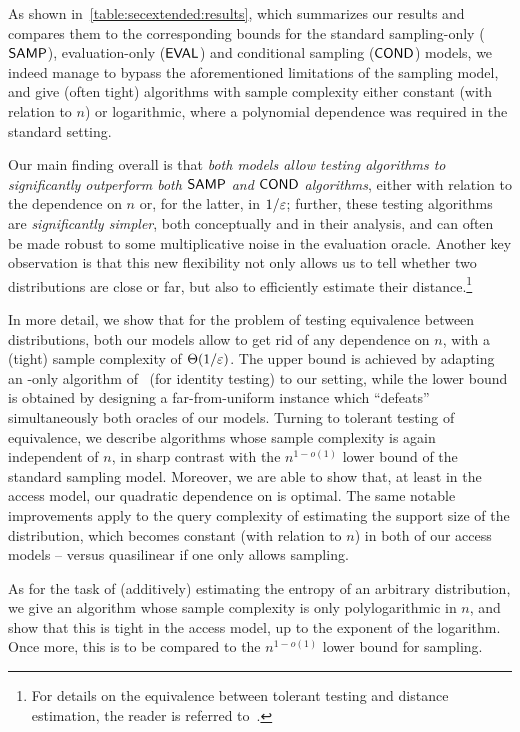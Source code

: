   As shown in~\cref{table:secextended:results}, which summarizes our results and compares them to the corresponding bounds for the standard sampling-only (${\sf SAMP}$), evaluation-only (${\sf EVAL}$) and conditional sampling (${\sf COND}$) models, we indeed manage to bypass the aforementioned limitations of the sampling model, and give (often tight) algorithms with sample complexity either constant (with relation to $n$) or logarithmic, where a polynomial dependence was required in the standard setting.
  
  Our main finding overall is that \emph{both \pdfsamp models allow testing algorithms to significantly outperform both ${\sf SAMP}$ and ${\sf COND}$ algorithms}, either with relation to the dependence on $n$ or, for the latter, in $1/\varepsilon$; further, these testing algorithms are \emph{significantly simpler}, both conceptually and in their analysis, and can often be made robust to some multiplicative noise in the evaluation oracle. Another key observation is that this new flexibility not only allows us to tell whether two distributions are close or far, but also to efficiently estimate their distance.\footnote{For details on the equivalence between tolerant testing and distance estimation, the reader is referred to~\cite{PRR:06}.}
  
  In more detail, we show that for the problem of testing equivalence between distributions, both our models allow to get rid of any dependence on $n$, with a (tight) sample complexity of $\bigTheta{1/\eps}$. The upper bound is achieved by adapting an \EVAL-only algorithm of~\cite{RS:09} (for identity testing) to our setting, while the lower bound is obtained by designing a far-from-uniform instance which ``defeats'' simultaneously both oracles of our models. Turning to tolerant testing of equivalence, we describe algorithms whose sample complexity is again independent of $n$, in sharp contrast with the $n^{1-o(1)}$ lower bound of the standard sampling model. Moreover, we are able to show that, at least in the \Pdfsamp access model, our quadratic dependence on \eps is optimal. The same notable improvements apply to the query complexity of estimating the support size of the distribution, which becomes constant (with relation to $n$) in both of our access models -- versus quasilinear if one only allows sampling.
  
  As for the task of (additively) estimating the entropy of an arbitrary distribution, we give an algorithm whose sample complexity is only polylogarithmic in $n$, and show that this is tight in the \Pdfsamp access model, up to the exponent of the logarithm. Once more, this is to be compared to the $n^{1-o(1)}$ lower bound for sampling.
  
